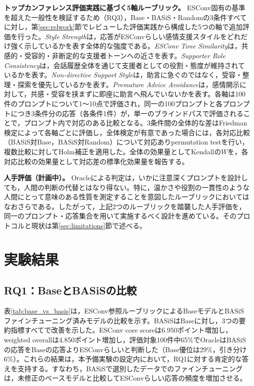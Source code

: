 \documentclass[manuscript,review,anonymous]{acmart}
\begin{document}
\textbf{トップカンファレンス評価実践に基づく5軸ルーブリック。} ESConv固有の基準を超えた一般性を検証するため（RQ3），Base・BASiS・Randomの3条件すべてに対し，第\ref{sec:relwork}節でレビューした評価実践から構成した5つの軸で追加評価を行った。\emph{Style Strength}は，応答がESConvらしい感情支援スタイルをどれだけ強く示しているかを表す全体的な強度\cite{mir2019styletransfer}である。\emph{ESConv Tone Similarity}は，共感的・受容的・非断定的な支援者トーンへの近さを表す\cite{liu2021esconv}。\emph{Supporter Role Consistency}は，会話履歴全体を通じて支援者としての役割・態度が維持されているかを表す\cite{zhang2018persona}。\emph{Non-directive Support Style}は，助言に急ぐのではなく，受容・整理・探索を優先しているかを表す\cite{deng2023mixedinitiative}。\emph{Premature Advice Avoidance}は，感情開示に対して，共感・受容を挟まずに即座に助言へ飛んでいないかを表す\cite{liu2021esconv,deng2023mixedinitiative}。各軸は100件のプロンプトについて1〜10点で評価され，同一の100プロンプトと各プロンプトにつき3条件分の応答（各条件1件）が，単一のブラインドパスで評価されることで，プロンプト内で対応のある比較となる。3条件間の全体的な差はFriedman検定によって各軸ごとに評価し，全体検定が有意であった場合には，各対応比較（BASiS対Base，BASiS対Random）について対応ありpermutation testを行い，複数比較に対してHolm補正を適用した。全体の効果量としてKendallの$W$を，各対応比較の効果量として対応差の標準化効果量を報告する。

\textbf{人手評価（計画中）。} Oracleによる判定は，いかに注意深くプロンプトを設計しても，人間の判断の代替とはなり得ない。特に，温かさや役割の一貫性のような人間にとって意味のある性質を測定することを意図したルーブリックにおいてはなおさらである。したがって，上記2つのルーブリックを踏襲した人手評価を，同一のプロンプト・応答集合を用いて実施するべく設計を進めている。そのプロトコルと現状は第\ref{sec:limitations}節で述べる。


\section{実験結果}
\label{sec:results}

\subsection{RQ1：BaseとBASiSの比較}
表\ref{tab:base_vs_basis}は，ESConv参照ルーブリックによるBaseモデルとBASiSファインチューニング済みモデルの比較を示す。BASiSはBaseに対し，3つの要約指標すべてで改善を示した。ESConv core scoreは6.950ポイント増加し，weighted overallは4.850ポイント増加し，評価対象100件中65\%でOracleはBASiSの応答をBaseの応答よりESConvらしいと判断した（Base優位は29\%，引き分け6\%）。これらの結果は，本予備実験の設定内において，RQ1に対する肯定的な答えを支持する。すなわち，BASiSで選別したデータでのファインチューニングは，未修正のベースモデルと比較してESConvらしい応答の頻度を増加させる。
\end{document}
